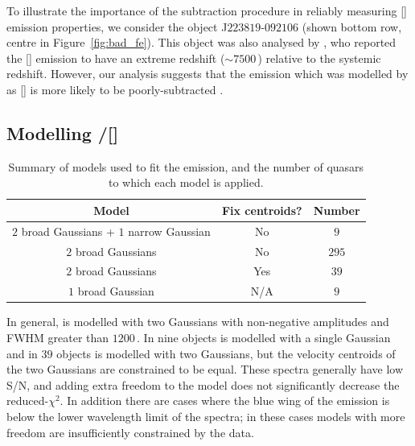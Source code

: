 To illustrate the importance of the  subtraction procedure in reliably measuring [] emission properties, we consider the object J$223819$-$092106$ (shown bottom row, centre in Figure~\ref{fig:bad_fe}). 
This object was also analysed by \citet{shen16a}, who reported the [] emission to have an extreme redshift ($\sim7500$\,\kms) relative to the \citet{hewett10} systemic redshift.
However, our analysis suggests that the emission which was modelled by \citet{shen16a} as [] is more likely to be poorly-subtracted .  

\subsection{Modelling \hbns/[]}
\label{sec:oiiimodel}

\begin{table}
  \centering
  \footnotesize 
    \begin{tabular}{ccc} 
    \hline
    Model & Fix centroids? & Number \\
    \hline
    $2$ broad Gaussians + $1$ narrow Gaussian & No & $9$ \\
    $2$ broad Gaussians & No  &  $295$ \\
    $2$ broad Gaussians & Yes &  $39$ \\
    $1$ broad Gaussian  & N/A &  $9$ \\
    \hline
    \end{tabular}
    \caption[{Summary of models used to fit the \hb emission, and the number of quasars to which each model is applied.}]{Summary of models used to fit the \hb emission, and the number of quasars to which each model is applied.}
  \label{tab:hbmod}
\end{table} 

In general, \hb is modelled with two Gaussians with non-negative amplitudes and FWHM greater than $1200$\,\kms.
In nine objects \hb is modelled with a single Gaussian and in $39$ objects \hb is modelled with two Gaussians, but the velocity centroids of the two Gaussians are constrained to be equal. 
These spectra generally have low S/N, and adding extra freedom to the model does not significantly decrease the  reduced-$\chi^2$.
In addition there are cases where the blue wing of the \hb emission is below the lower wavelength limit of the spectra; in these cases models with more freedom are insufficiently constrained by the data.    

